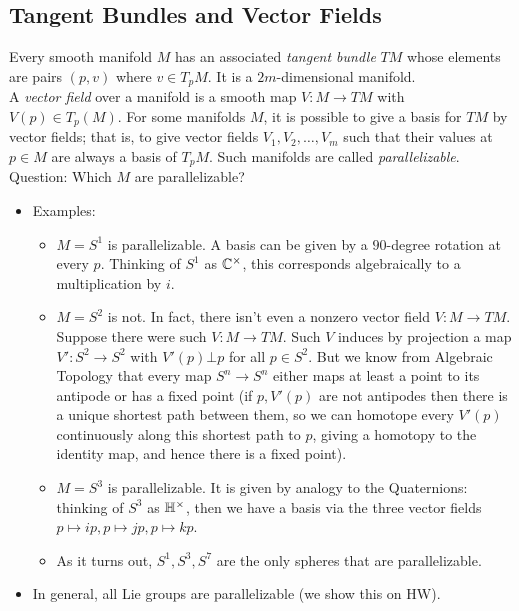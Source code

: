 \documentclass{amsart}
\begin{document}
\subsection{Tangent Bundles and Vector Fields} Every smooth manifold $M$ has an associated \textit{tangent bundle} $TM$ whose elements are pairs $(p,v)$ where $v\in T_pM$. It is a $2m$-dimensional manifold.\\

A \textit{vector field} over a manifold is a smooth map $V:M\to TM$ with $V(p)\in T_p(M)$. For some manifolds $M$, it is possible to give a basis for $TM$ by vector fields; that is, to give vector fields $V_1,V_2,\dots,V_m$ such that their values at $p\in M$ are always a basis of $T_pM$. Such manifolds are called \textit{parallelizable}.\\

Question: Which $M$ are parallelizable?
\begin{itemize}
	\item Examples:
	\begin{itemize}
		\item $M=S^1$ is parallelizable. A basis can be given by a $90$-degree rotation at every $p$. Thinking of $S^1$ as $\mathbb{C}^{\times}$, this corresponds algebraically to a multiplication by $i$.
		\item $M=S^2$ is not. In fact, there isn't even a nonzero vector field $V:M\to TM$. Suppose there were such $V:M\to TM$. Such $V$ induces by projection a map $V':S^2\to S^2$ with $V'(p)\bot p$ for all $p\in S^2$. But we know from Algebraic Topology that every map $S^n\to S^n$ either maps at least a point to its antipode or has a fixed point (if $p,V'(p)$ are not antipodes then there is a unique shortest path between them, so we can homotope every $V'(p)$ continuously along this shortest path to $p$, giving a homotopy to the identity map, and hence there is a fixed point).
		\item $M=S^3$ is parallelizable. It is given by analogy to the Quaternions: thinking of $S^3$ as $\mathbb{H}^{\times}$, then we have a basis via the three vector fields $p\mapsto ip,p\mapsto jp,p\mapsto kp$. 
		\item As it turns out, $S^1,S^3,S^7$ are the only spheres that are parallelizable.
	
	\end{itemize}
	\item In general, all Lie groups are parallelizable (we show this on HW).\\
	\end{itemize}
	
\end{document}
